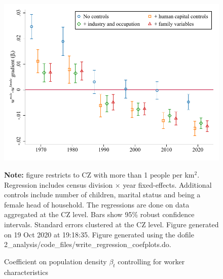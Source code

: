 \begin{figure}[!h]
\centering
\caption{Coefficient on population density $ \beta_t $ controlling for worker characteristics}
\includegraphics[width=.6\textwidth]{../2_analysis/output/figures/with_control_gradients_individual_l_czone_pop_full_time}
\par \begin{minipage}[h]{\textwidth}{\tiny\textbf{Note:} figure restricts to CZ with more than 1 people per km$^2$. Regression includes census division $\times $ year fixed-effects. Additional controls include number of children, marital status and being a female head of household. The regressions are done on data aggregated at the CZ level. Bars show 95\% robust confidence intervals. Standard errors clustered at the CZ level. Figure generated on 19 Oct 2020 at 19:18:35. Figure generated using the dofile 2\_analysis/code\_files/write\_regression\_coefplots.do.}\end{minipage}
\end{figure}

